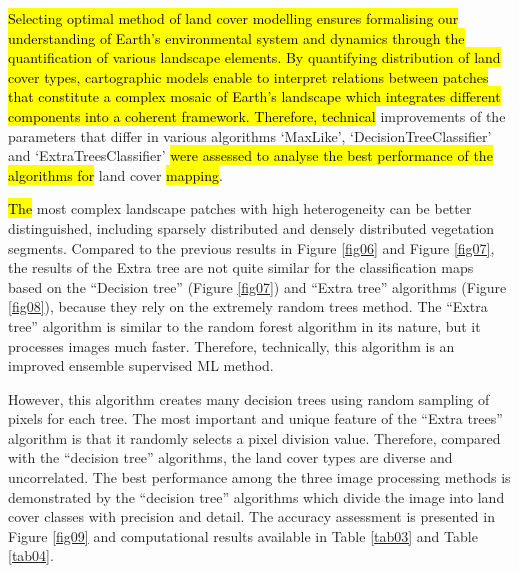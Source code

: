 \documentclass[geomatics,article,submit,pdftex,moreauthors]{Definitions/mdpi}
\begin{document}
\hl{Selecting optimal method of land cover modelling ensures formalising our understanding of Earth's environmental system and dynamics through the quantification of various landscape elements. By quantifying distribution of land cover types, cartographic models enable to interpret relations between patches that constitute a complex mosaic of Earth's landscape which integrates different components into a coherent framework. Therefore, technical} improvements of the parameters that differ in various algorithms ‘MaxLike’, ‘DecisionTreeClassifier’ and ‘ExtraTreesClassifier’ \hl{were assessed to analyse the best performance of the algorithms for} land cover \hl{mapping}. 

\hl{The} most complex landscape patches with high heterogeneity can be better distinguished, including sparsely distributed and densely distributed vegetation segments. Compared to the previous results in Figure \ref{fig06} and Figure \ref{fig07}, the results of the Extra tree are not quite similar for the classification maps based on the “Decision tree” (Figure \ref{fig07}) and “Extra tree” algorithms (Figure \ref{fig08}), because they rely on the extremely random trees method. The “Extra tree” algorithm is similar to the random forest algorithm in its nature, but it processes images much faster. Therefore, technically, this algorithm is an improved ensemble supervised ML method.

However, this algorithm creates many decision trees using random sampling of pixels for each tree. The most important and unique feature of the “Extra trees” algorithm is that it randomly selects a pixel division value. Therefore, compared with the “decision tree” algorithms, the land cover types are diverse and uncorrelated. The best performance among the three image processing methods is demonstrated by the “decision tree” algorithms which divide the image into land cover classes with precision and detail. The accuracy assessment is presented in Figure \ref{fig09} and computational results available in Table \ref{tab03} and Table \ref{tab04}.
\end{document}
